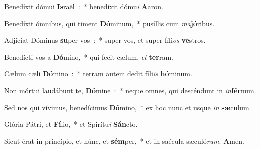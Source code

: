 \item Benedíxit dómui \textbf{Is}\-raël~:~* benedíxit dómu\emph{i} \textbf{A}aron.
\item Benedíxit ómnibus, qui timent \textbf{Dó}\-minum,~* pusíllis cum \emph{ma}\textbf{jó}ribus.
\item Adjíciat Dóminus \textbf{su}\-per vos~:~* super vos, et super fíli\emph{os} \textbf{ve}stros.
\item Benedícti vos a \textbf{Dó}\-mino,~* qui fecit cælum, \emph{et} \textbf{ter}ram.
\item Cælum cæli \textbf{Dó}\-mino~:~* terram autem dedit fíli\emph{is} \textbf{hó}minum.
\item Non mórtui laudábunt te, \textbf{Dó}\-mine~:~* neque omnes, qui descéndunt in \emph{in}\textbf{fér}num.
\item Sed nos qui vívimus, benedícimus \textbf{Dó}\-mino,~* ex hoc nunc et usque \emph{in} \textbf{sæ}culum.
\item Glória Pátri, et \textbf{Fí}\-lio,~* et Spirítu\emph{i} \textbf{Sán}cto.
\item Sicut érat in princípio, et núnc, et \textbf{sém}\-per,~* et in saécula sæculó\emph{rum}. \textbf{A}men.